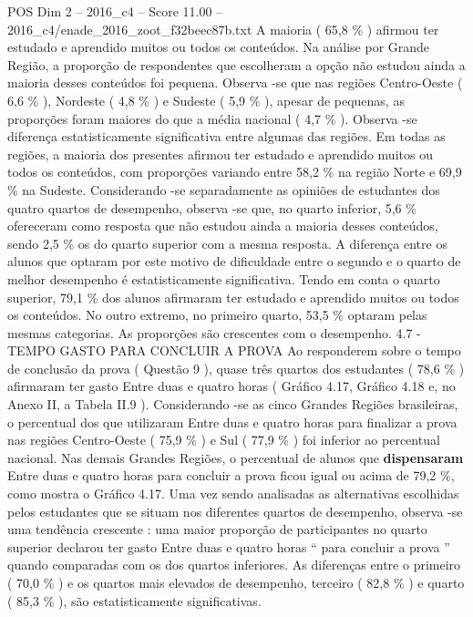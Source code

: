 \begin{textsample}{POS Dim 2 – 2016\_c4 – Score 11.00 – 2016\_c4/enade\_2016\_zoot\_f32beec87b.txt}
A maioria ( 65,8 \% ) afirmou ter estudado e aprendido muitos ou todos os conteúdos.
Na análise por Grande Região, a proporção de respondentes que escolheram a opção não estudou ainda a maioria desses conteúdos foi pequena.
Observa -se que nas regiões Centro-Oeste ( 6,6 \% ), Nordeste ( 4,8 \% ) e Sudeste ( 5,9 \% ), apesar de pequenas, as proporções foram maiores do que a média nacional ( 4,7 \% ).
Observa -se diferença estatisticamente significativa entre algumas das regiões.
Em todas as regiões, a maioria dos presentes afirmou ter estudado e aprendido muitos ou todos os conteúdos, com proporções variando entre 58,2 \% na região Norte e 69,9 \% na Sudeste.
Considerando -se separadamente as opiniões de estudantes dos quatro quartos de desempenho, observa -se que, no quarto inferior, 5,6 \% ofereceram como resposta que não estudou ainda a maioria desses conteúdos, sendo 2,5 \% os do quarto superior com a mesma resposta.
A diferença entre os alunos que optaram por este motivo de dificuldade entre o segundo e o quarto de melhor desempenho é estatisticamente significativa.
Tendo em conta o quarto superior, 79,1 \% dos alunos afirmaram ter estudado e aprendido muitos ou todos os conteúdos.
No outro extremo, no primeiro quarto, 53,5 \% optaram pelas mesmas categorias.
As proporções são crescentes com o desempenho. 4.7 - TEMPO GASTO PARA CONCLUIR A PROVA Ao responderem sobre o tempo de conclusão da prova ( Questão 9 ), quase três quartos dos estudantes ( 78,6 \% ) afirmaram ter gasto Entre duas e quatro horas ( Gráfico 4.17, Gráfico 4.18 e, no Anexo II, a Tabela II.9 ).
Considerando -se as cinco Grandes Regiões brasileiras, o percentual dos que utilizaram Entre duas e quatro horas para finalizar a prova nas regiões Centro-Oeste ( 75,9 \% ) e Sul ( 77,9 \% ) foi inferior ao percentual nacional.
Nas demais Grandes Regiões, o percentual de alunos que \textbf{dispensaram} Entre duas e quatro horas para concluir a prova ficou igual ou acima de 79,2 \%, como mostra o Gráfico 4.17.
Uma vez sendo analisadas as alternativas escolhidas pelos estudantes que se situam nos diferentes quartos de desempenho, observa -se uma tendência crescente : uma maior proporção de participantes no quarto superior declarou ter gasto Entre duas e quatro horas “ para concluir a prova ” quando comparadas com os dos quartos inferiores.
As diferenças entre o primeiro ( 70,0 \% ) e os quartos mais elevados de desempenho, terceiro ( 82,8 \% ) e quarto ( 85,3 \% ), são estatisticamente significativas.

\end{textsample}
